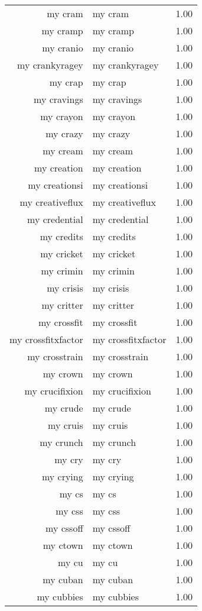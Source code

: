 \begin{table}[ht]
\begin{tabular}{rlr}
  my cram & my cram & 1.00 \\ 
  my cramp & my cramp & 1.00 \\ 
  my cranio & my cranio & 1.00 \\ 
  my crankyragey & my crankyragey & 1.00 \\ 
  my crap & my crap & 1.00 \\ 
  my cravings & my cravings & 1.00 \\ 
  my crayon & my crayon & 1.00 \\ 
  my crazy & my crazy & 1.00 \\ 
  my cream & my cream & 1.00 \\ 
  my creation & my creation & 1.00 \\ 
  my creationsi & my creationsi & 1.00 \\ 
  my creativeflux & my creativeflux & 1.00 \\ 
  my credential & my credential & 1.00 \\ 
  my credits & my credits & 1.00 \\ 
  my cricket & my cricket & 1.00 \\ 
  my crimin & my crimin & 1.00 \\ 
  my crisis & my crisis & 1.00 \\ 
  my critter & my critter & 1.00 \\ 
  my crossfit & my crossfit & 1.00 \\ 
  my crossfitxfactor & my crossfitxfactor & 1.00 \\ 
  my crosstrain & my crosstrain & 1.00 \\ 
  my crown & my crown & 1.00 \\ 
  my crucifixion & my crucifixion & 1.00 \\ 
  my crude & my crude & 1.00 \\ 
  my cruis & my cruis & 1.00 \\ 
  my crunch & my crunch & 1.00 \\ 
  my cry & my cry & 1.00 \\ 
  my crying & my crying & 1.00 \\ 
  my cs & my cs & 1.00 \\ 
  my css & my css & 1.00 \\ 
  my cssoff & my cssoff & 1.00 \\ 
  my ctown & my ctown & 1.00 \\ 
  my cu & my cu & 1.00 \\ 
  my cuban & my cuban & 1.00 \\ 
  my cubbies & my cubbies & 1.00 \\ 

\end{tabular}
\end{table}
